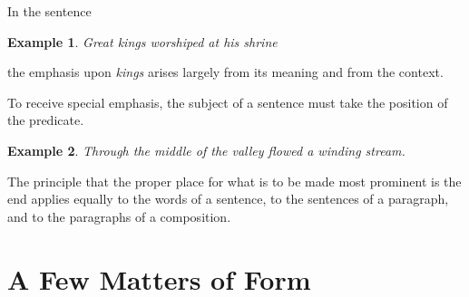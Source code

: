 \documentclass{book}
\numberwithin{equation}{section}
\newtheorem{example}{Example}[chapter]
\begin{document}
In the sentence
\begin{example}
    Great kings worshiped at his shrine
\end{example}
the emphasis upon \textit{kings} arises largely from its meaning and from the context.

To receive special emphasis, the subject of a sentence must take the position of the predicate.
\begin{example}
    Through the middle of the valley flowed a winding stream.
\end{example}
The principle that the proper place for what is to be made most prominent is the end applies equally to the words of a sentence, to the sentences of a paragraph, and to the paragraphs of a composition.


\chapter{A Few Matters of Form}
\end{document}
